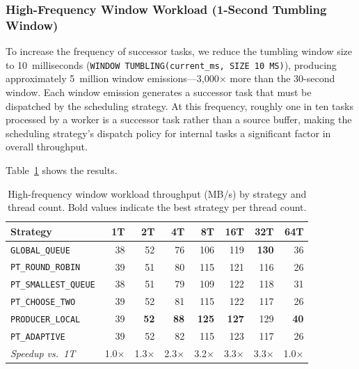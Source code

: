 \subsubsection{High-Frequency Window Workload (1-Second Tumbling Window)}

To increase the frequency of successor tasks, we reduce the tumbling window size to 10~milliseconds (\texttt{WINDOW TUMBLING(current\_ms, SIZE 10 MS)}), producing approximately 5~million window emissions---3,000$\times$ more than the 30-second window.
Each window emission generates a successor task that must be dispatched by the scheduling strategy.
At this frequency, roughly one in ten tasks processed by a worker is a successor task rather than a source buffer, making the scheduling strategy's dispatch policy for internal tasks a significant factor in overall throughput.

Table~\ref{tab:highfreq-strategies} shows the results.

\begin{table}[h]
\centering
\caption{High-frequency window workload throughput (MB/s) by strategy and thread count. Bold values indicate the best strategy per thread count.}
\label{tab:highfreq-strategies}
\begin{tabular}{l|rrrrrrr}
\hline
\textbf{Strategy} & \textbf{1T} & \textbf{2T} & \textbf{4T} & \textbf{8T} & \textbf{16T} & \textbf{32T} & \textbf{64T} \\
\hline
\texttt{GLOBAL\_QUEUE}      & 38 & 52 & 76 & 106 & 119 & \textbf{130} & 36 \\
\texttt{PT\_ROUND\_ROBIN}   & 39 & 51 & 80 & 115 & 121 & 116 & 26 \\
\texttt{PT\_SMALLEST\_QUEUE}& 38 & 51 & 79 & 109 & 122 & 118 & 31 \\
\texttt{PT\_CHOOSE\_TWO}    & 39 & 52 & 81 & 115 & 122 & 117 & 26 \\
\texttt{PRODUCER\_LOCAL}    & 39 & \textbf{52} & \textbf{88} & \textbf{125} & \textbf{127} & 129 & \textbf{40} \\
\texttt{PT\_ADAPTIVE}       & 39 & 52 & 82 & 115 & 123 & 117 & 26 \\
\hline
\textit{Speedup vs.\ 1T}   & 1.0$\times$ & 1.3$\times$ & 2.3$\times$ & 3.2$\times$ & 3.3$\times$ & 3.3$\times$ & 1.0$\times$ \\
\hline
\end{tabular}
\end{table}

